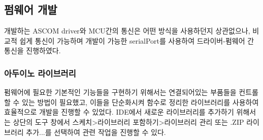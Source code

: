\subsection{펌웨어 개발}

개발하는 ASCOM driver와 MCU간의 통신은 어떤 방식을 사용하던지 상관없으나, 비교적 쉽게 통신이 가능하며 개발이 가능한 serialPort를 사용하여 드라이버-펌웨어 간 통신을 진행하였다.


\subsubsection{아두이노 라이브러리}
펌웨어에 필요한 기본적인 기능들을 구현하기 위해서는 연결되어있는 부품들을 컨트롤할 수 있는 방법이 필요했고, 이들을 단순화시켜 함수로 정리한 라이브러리를 사용하여 효율적으로 개발을 진행할 수 있었다.
IDE에서 새로운 라이브러리를 추가하기 위해서는 상단의 도구 창에서 스케치>라이브러리 포함하기>라이브러리 관리 또는 .ZIP 라이브러리 추가...를 선택하여 관련 작업을 진행할 수 있다.

